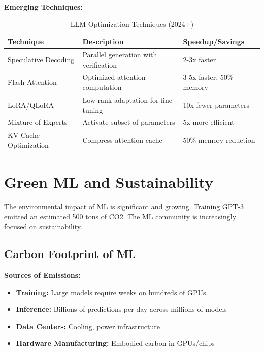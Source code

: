 \textbf{Emerging Techniques:}

\begin{table}[h]
\centering
\caption{LLM Optimization Techniques (2024+)}
\begin{tabular}{p{3.5cm}p{5cm}p{4cm}}
\toprule
\textbf{Technique} & \textbf{Description} & \textbf{Speedup/Savings} \\
\midrule
Speculative Decoding & Parallel generation with verification & 2-3x faster \\
\midrule
Flash Attention & Optimized attention computation & 3-5x faster, 50\% memory \\
\midrule
LoRA/QLoRA & Low-rank adaptation for fine-tuning & 10x fewer parameters \\
\midrule
Mixture of Experts & Activate subset of parameters & 5x more efficient \\
\midrule
KV Cache Optimization & Compress attention cache & 50\% memory reduction \\
\bottomrule
\end{tabular}
\end{table}

\section{Green ML and Sustainability}

The environmental impact of ML is significant and growing. Training GPT-3 emitted an estimated 500 tons of CO2. The ML community is increasingly focused on sustainability.

\subsection{Carbon Footprint of ML}

\textbf{Sources of Emissions:}

\begin{itemize}
    \item \textbf{Training:} Large models require weeks on hundreds of GPUs
    \item \textbf{Inference:} Billions of predictions per day across millions of models
    \item \textbf{Data Centers:} Cooling, power infrastructure
    \item \textbf{Hardware Manufacturing:} Embodied carbon in GPUs/chips
\end{itemize}


